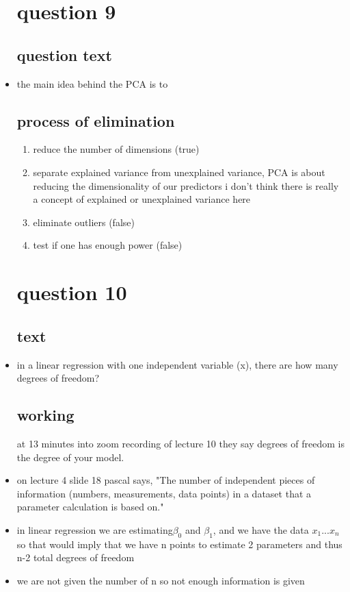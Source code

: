 \documentclass{article}
\begin{document}
\begin{itemize}
\section{question 9}
\subsection{question text}
\item the main idea behind the PCA is to
\subsection{process of elimination}
\begin{enumerate}
    \item reduce the number of dimensions (true)
    \item separate explained variance from unexplained variance, PCA is about reducing the dimensionality of our predictors i don't think there is really a concept of explained or unexplained variance here
    \item eliminate outliers (false)
    \item test if one has enough power (false)

\end{enumerate}    
    
 \section{question 10}
 \subsection{text}
 \item in a linear regression with one independent variable (x), there are how many degrees of freedom? 
\subsection{working }
\itme at 13 minutes into zoom recording of lecture 10 they say degrees of freedom is the degree of your model. 
\item on lecture 4 slide 18 pascal says, "The number of independent pieces of information
(numbers, measurements, data points) in a dataset
that a parameter calculation is based on."
\item in linear regression we are estimating$\beta_0$ and  $\beta_1$, and we have the data $x_1...x_n$ so that would imply that we have n points to estimate 2 parameters and thus n-2 total degrees of freedom 
\item we are not given the number of n so not enough information is given 

\end{itemize}
\end{document}
